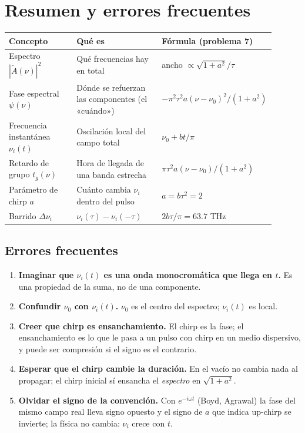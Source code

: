 \documentclass[11pt]{article}
\begin{document}
\section{Resumen y errores frecuentes}
\begin{center}
\renewcommand{\arraystretch}{1.35}
\begin{tabular}{@{}p{0.27\linewidth}p{0.33\linewidth}p{0.3\linewidth}@{}}
\toprule
\textbf{Concepto} & \textbf{Qué es} & \textbf{Fórmula (problema 7)}\\\midrule
Espectro $|\tilde A(\nu)|^2$ & Qué frecuencias hay en total & ancho $\propto\sqrt{1+a^2}/\tau$\\
Fase espectral $\psi(\nu)$ & Dónde se refuerzan las componentes (el «cuándo») & $-\pi^2\tau^2a(\nu-\nu_0)^2/(1+a^2)$\\
Frecuencia instantánea $\nu_i(t)$ & Oscilación local del campo total & $\nu_0+bt/\pi$\\
Retardo de grupo $t_g(\nu)$ & Hora de llegada de una banda estrecha & $\pi\tau^2a(\nu-\nu_0)/(1+a^2)$\\
Parámetro de chirp $a$ & Cuánto cambia $\nu_i$ dentro del pulso & $a=b\tau^2=2$\\
Barrido $\Delta\nu_i$ & $\nu_i(\tau)-\nu_i(-\tau)$ & $2b\tau/\pi=63.7$ THz\\
\bottomrule
\end{tabular}
\end{center}

\subsection*{Errores frecuentes}
\begin{enumerate}
\item \textbf{Imaginar que $\nu_i(t)$ es una onda monocromática que llega en $t$.} Es una propiedad de la suma, no de una componente.
\item \textbf{Confundir $\nu_0$ con $\nu_i(t)$.} $\nu_0$ es el centro del espectro; $\nu_i(t)$ es local.
\item \textbf{Creer que chirp es ensanchamiento.} El chirp es la fase; el ensanchamiento es lo que le pasa a un pulso con chirp en un medio dispersivo, y puede ser compresión si el signo es el contrario.
\item \textbf{Esperar que el chirp cambie la duración.} En el vacío no cambia nada al propagar; el chirp inicial sí ensancha el \emph{espectro} en $\sqrt{1+a^2}$.
\item \textbf{Olvidar el signo de la convención.} Con $e^{-i\omega t}$ (Boyd, Agrawal) la fase del mismo campo real lleva signo opuesto y el signo de $a$ que indica up-chirp se invierte; la física no cambia: $\nu_i$ crece con $t$.
\end{enumerate}
\end{document}
